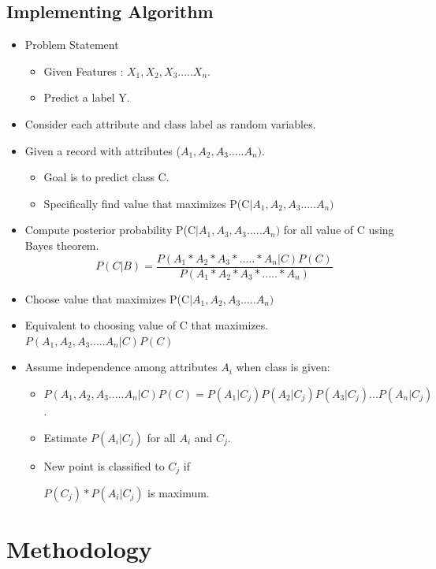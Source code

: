 \section{Implementing Algorithm}
\begin{itemize}
\item Problem Statement

\begin{itemize}
 \item Given Features : $X_1,X_2,X_3.....X_n.$
 \item Predict a label Y.
\end{itemize}

\item Consider each attribute and class label as random variables.
\item Given a record with attributes ($A_1,A_2,A_3.....A_n)$.
\begin{itemize}
\item Goal is to predict class C.
\item Specifically find value that maximizes P(C$|A_1,A_2,A_3.....A_n)$
\end{itemize}
\item Compute posterior probability P(C$|A_1,A_3,A_3.....A_n)$ for all value of C using Bayes theorem.
\[P(C|B)=\frac{P(A_1*A_2*A_3*.....*A_n|C)P(C)}{P(A_1*A_2*A_3*.....*A_n)}\]
\item Choose value that maximizes P(C$|A_1,A_2,A_3.....A_n)$
\item Equivalent to choosing value of C that maximizes.
$P(A_1,A_2,A_3.....A_n|C)P(C)$

\item Assume independence among attributes $A_i$ when class is given:
\begin{itemize}
\item $P(A_1,A_2,A_3.....A_n|C)P(C)=P(A_1|C_j)P(A_2|C_j)P(A_3|C_j)...P(A_n|C_j)$.
\item Estimate $P(A_i|C_j)$ for all $A_i$ and $C_j$.
\item New point is classified to $C_j$ if
\par 
$P(C_j)*P(A_i|C_j)$ is maximum.
\end{itemize}

\end{itemize}



\chapter{Methodology}
